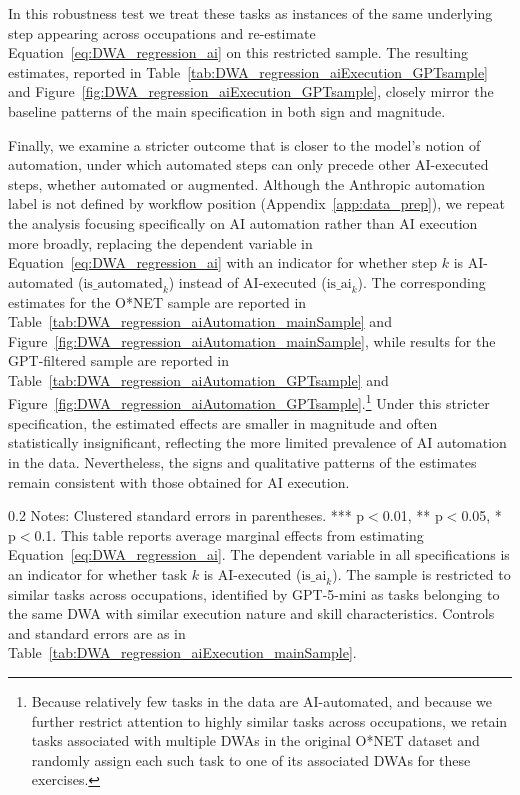 In this robustness test we treat these tasks as instances of the same underlying step appearing across occupations and re-estimate Equation~\eqref{eq:DWA_regression_ai} on this restricted sample.
The resulting estimates, reported in Table~\ref{tab:DWA_regression_aiExecution_GPTsample} and Figure~\ref{fig:DWA_regression_aiExecution_GPTsample}, closely mirror the baseline patterns of the main specification in both sign and magnitude.

Finally, we examine a stricter outcome that is closer to the model's notion of automation, under which automated steps can only precede other AI-executed steps, whether automated or augmented.
Although the Anthropic automation label is not defined by workflow position (Appendix~\ref{app:data_prep}), we repeat the analysis focusing specifically on AI automation rather than AI execution more broadly, replacing the dependent variable in Equation~\eqref{eq:DWA_regression_ai} with an indicator for whether step $k$ is AI-automated ($\text{is\_automated}_{k}$) instead of AI-executed ($\text{is\_ai}_{k}$).
The corresponding estimates for the O*NET sample are reported in Table~\ref{tab:DWA_regression_aiAutomation_mainSample} and Figure~\ref{fig:DWA_regression_aiAutomation_mainSample}, while results for the GPT-filtered sample are reported in Table~\ref{tab:DWA_regression_aiAutomation_GPTsample} and Figure~\ref{fig:DWA_regression_aiAutomation_GPTsample}.\footnote{
Because relatively few tasks in the data are AI-automated, and because we further restrict attention to highly similar tasks across occupations, we retain tasks associated with multiple DWAs in the original O*NET dataset and randomly assign each such task to one of its associated DWAs for these exercises.
}
Under this stricter specification, the estimated effects are smaller in magnitude and often statistically insignificant, reflecting the more limited prevalence of AI automation in the data. Nevertheless, the signs and qualitative patterns of the estimates remain consistent with those obtained for AI execution.

\newpage
\begin{table}[!t]
\centering
\caption{Neighboring Tasks' AI Execution Status and a Task's AI Execution (GPT-filtered Sample)}
\label{tab:DWA_regression_aiExecution_GPTsample}
    \footnotesize
\resizebox{\textwidth}{!}{

}
\begin{minipage}{1\linewidth}
\begin{spacing}{0.2}
{\fontsize{9.5pt}{10pt}\selectfont Notes: Clustered standard errors in parentheses. *** p$<$0.01, ** p$<$0.05, * p$<$0.1.
This table reports average marginal effects from estimating Equation~\eqref{eq:DWA_regression_ai}.
The dependent variable in all specifications is an indicator for whether task $k$ is AI-executed ($\text{is\_ai}_{k}$).
The sample is restricted to similar tasks across occupations, identified by GPT-5-mini as tasks belonging to the same DWA with similar execution nature and skill characteristics.
Controls and standard errors are as in Table~\ref{tab:DWA_regression_aiExecution_mainSample}.}
\end{spacing}
\end{minipage}\end{table}

